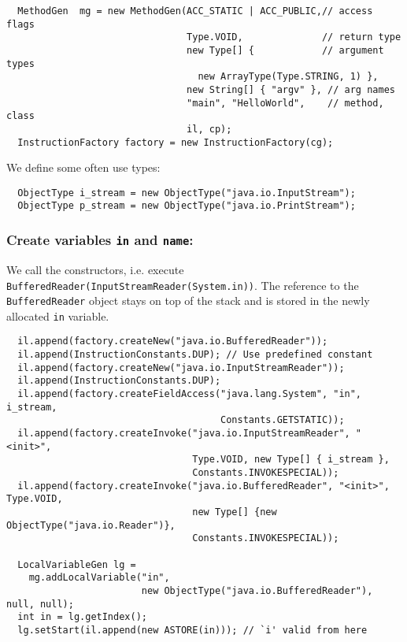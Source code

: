 {\small\begin{verbatim}
  MethodGen  mg = new MethodGen(ACC_STATIC | ACC_PUBLIC,// access flags
                                Type.VOID,              // return type
                                new Type[] {            // argument types
                                  new ArrayType(Type.STRING, 1) },
                                new String[] { "argv" }, // arg names
                                "main", "HelloWorld",    // method, class
                                il, cp);
  InstructionFactory factory = new InstructionFactory(cg);
\end{verbatim}}

We define some often use types:

{\small\begin{verbatim}
  ObjectType i_stream = new ObjectType("java.io.InputStream");
  ObjectType p_stream = new ObjectType("java.io.PrintStream");
\end{verbatim}}

\subsubsection{Create variables \texttt{in} and \texttt{name}:}

We call the           constructors,              i.e.              execute
\texttt{BufferedReader(Input\-Stream\-Reader(System.in))}.  The  reference
to the \texttt{BufferedReader} object stays on top of the stack and is
stored in the newly allocated \texttt{in} variable.

{\small\begin{verbatim}
  il.append(factory.createNew("java.io.BufferedReader"));
  il.append(InstructionConstants.DUP); // Use predefined constant
  il.append(factory.createNew("java.io.InputStreamReader"));
  il.append(InstructionConstants.DUP);
  il.append(factory.createFieldAccess("java.lang.System", "in", i_stream,
                                      Constants.GETSTATIC));
  il.append(factory.createInvoke("java.io.InputStreamReader", "<init>",
                                 Type.VOID, new Type[] { i_stream },
                                 Constants.INVOKESPECIAL));
  il.append(factory.createInvoke("java.io.BufferedReader", "<init>", Type.VOID,
                                 new Type[] {new ObjectType("java.io.Reader")},
                                 Constants.INVOKESPECIAL));

  LocalVariableGen lg =
    mg.addLocalVariable("in",
                        new ObjectType("java.io.BufferedReader"), null, null);
  int in = lg.getIndex();
  lg.setStart(il.append(new ASTORE(in))); // `i' valid from here
\end{verbatim}}

